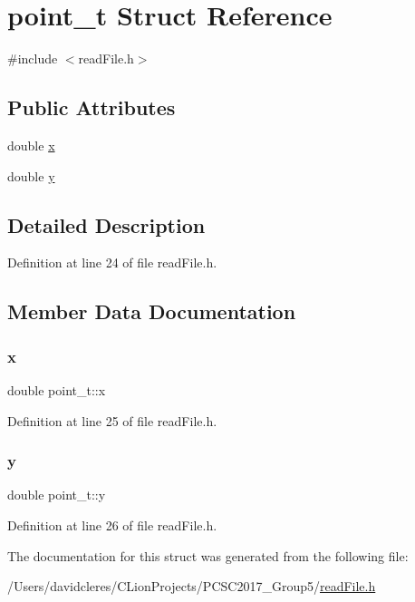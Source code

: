 \hypertarget{structpoint__t}{}\section{point\+\_\+t Struct Reference}
\label{structpoint__t}


{\ttfamily \#include $<$read\+File.\+h$>$}

\subsection*{Public Attributes}
\begin{DoxyCompactItemize}
\item 
double \mbox{\hyperlink{structpoint__t_acf7556ca44360564040f5c86257b55b1}{x}}
\item 
double \mbox{\hyperlink{structpoint__t_a8590af4986d0e4ef2b6756946f80438c}{y}}
\end{DoxyCompactItemize}


\subsection{Detailed Description}


Definition at line 24 of file read\+File.\+h.



\subsection{Member Data Documentation}
\mbox{\label{structpoint__t_acf7556ca44360564040f5c86257b55b1}} 
\subsubsection{\texorpdfstring{x}{x}}
{\footnotesize\ttfamily double point\+\_\+t\+::x}



Definition at line 25 of file read\+File.\+h.

\mbox{\label{structpoint__t_a8590af4986d0e4ef2b6756946f80438c}} 
\subsubsection{\texorpdfstring{y}{y}}
{\footnotesize\ttfamily double point\+\_\+t\+::y}



Definition at line 26 of file read\+File.\+h.



The documentation for this struct was generated from the following file\+:\begin{DoxyCompactItemize}
\item 
/\+Users/davidcleres/\+C\+Lion\+Projects/\+P\+C\+S\+C2017\+\_\+\+Group5/\mbox{\hyperlink{read_file_8h}{read\+File.\+h}}\end{DoxyCompactItemize}
